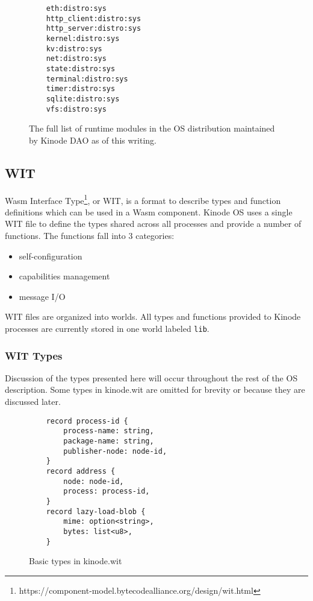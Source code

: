 \documentclass[runningheads]{llncs}
\begin{document}
\begin{figure}
    \centering
    \begin{lstlisting}
    eth:distro:sys
    http_client:distro:sys
    http_server:distro:sys
    kernel:distro:sys
    kv:distro:sys
    net:distro:sys
    state:distro:sys
    terminal:distro:sys
    timer:distro:sys
    sqlite:distro:sys
    vfs:distro:sys
    \end{lstlisting}
    \caption{The full list of runtime modules in the OS distribution maintained by Kinode DAO as of this writing.}
    \label{fig:runtime modules list}
\end{figure}

\subsection{WIT}

Wasm Interface Type\footnote{https://component-model.bytecodealliance.org/design/wit.html}, or WIT, is a format to describe types and function definitions which can be used in a Wasm component.
Kinode OS uses a single WIT file to define the types shared across all processes and provide a number of functions.
The functions fall into 3 categories:
\begin{itemize}
    \item self-configuration
    \item capabilities management
    \item message I/O
\end{itemize}

WIT files are organized into worlds. All types and functions provided to Kinode processes are currently stored in one world labeled \verb|lib|.

\subsubsection{WIT Types}

Discussion of the types presented here will occur throughout the rest of the OS description.
Some types in kinode.wit are omitted for brevity or because they are discussed later.

\begin{figure}[htbp]
    \centering
    \begin{lstlisting}
    record process-id {
        process-name: string,
        package-name: string,
        publisher-node: node-id,
    }
    record address {
        node: node-id,
        process: process-id,
    }
    record lazy-load-blob {
        mime: option<string>,
        bytes: list<u8>,
    }
    \end{lstlisting}
    \caption{Basic types in kinode.wit}
    \label{fig:WIT Types 1}
\end{figure}
\end{document}
